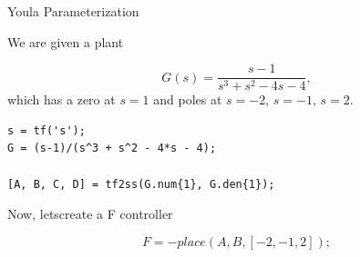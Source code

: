 Youla Parameterization

We are given a plant 

\[
    G(s) = \frac{s-1}{s^3 + s^2 - 4s - 4},
\]
which has a zero at $s=1$ and poles at $s=-2,\,s=-1,\,s=2$.

\begin{lstlisting}
s = tf('s');
G = (s-1)/(s^3 + s^2 - 4*s - 4);

[A, B, C, D] = tf2ss(G.num{1}, G.den{1});
\end{lstlisting}

Now, letscreate a F controller 

\[
    F = -place(A, B, [-2, -1, 2]);
\]

